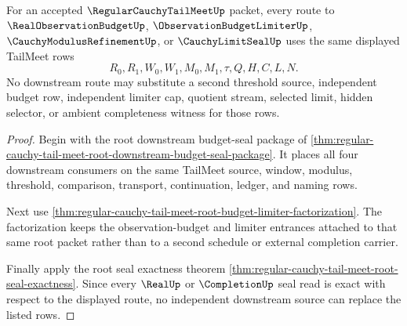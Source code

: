 \begin{theorem}
\label{thm:regular-cauchy-tail-meet-downstream-budget-source-lock}
For an accepted $\RegularCauchyTailMeetUp$ packet, every route to $\RealObservationBudgetUp$, $\ObservationBudgetLimiterUp$, $\CauchyModulusRefinementUp$, or $\CauchyLimitSealUp$ uses the same displayed TailMeet rows
$$
R_0,R_1,W_0,W_1,M_0,M_1,\tau,Q,H,C,L,N.
$$
No downstream route may substitute a second threshold source, independent budget row, independent limiter cap, quotient stream, selected limit, hidden selector, or ambient completeness witness for those rows.
\end{theorem}
\begin{proof}
Begin with the root downstream budget-seal package of \autoref{thm:regular-cauchy-tail-meet-root-downstream-budget-seal-package}. It places all four downstream consumers on the same TailMeet source, window, modulus, threshold, comparison, transport, continuation, ledger, and naming rows.

Next use \autoref{thm:regular-cauchy-tail-meet-root-budget-limiter-factorization}. The factorization keeps the observation-budget and limiter entrances attached to that same root packet rather than to a second schedule or external completion carrier.

Finally apply the root seal exactness theorem \autoref{thm:regular-cauchy-tail-meet-root-seal-exactness}. Since every $\RealUp$ or $\CompletionUp$ seal read is exact with respect to the displayed route, no independent downstream source can replace the listed rows.
\end{proof}

